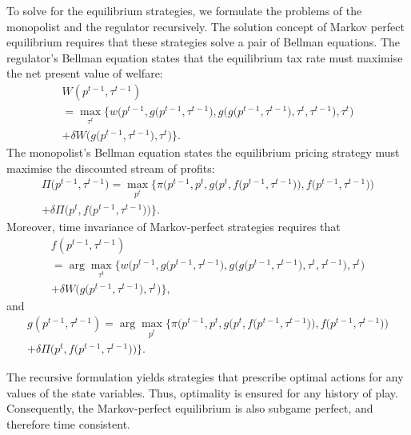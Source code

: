 To solve for the equilibrium strategies, we formulate the problems of the
monopolist and the regulator recursively. The solution concept of Markov
perfect equilibrium requires that these strategies solve a pair of Bellman
equations. The regulator's Bellman equation states that the equilibrium tax
rate must maximise the net present value of welfare: 
\begin{multline}
W(p^{t-1},\tau ^{t-1})  \label{tax:Bell_reg} \\
=\max_{\tau ^{t}}\Bigg\{w\bigg(p^{t-1},g\big(p^{t-1},\tau ^{t-1}\big),g\Big(g%
\big(p^{t-1},\tau ^{t-1}\big),\tau ^{t},\tau ^{t-1}\Big),\tau ^{t}\bigg) \\
+\delta W\Big(g\big(p^{t-1},\tau ^{t-1}\big),\tau ^{t}\Big)\Bigg\}.
\end{multline}%
The monopolist's Bellman equation states the equilibrium pricing strategy
must maximise the discounted stream of profits: 
\begin{multline}
\Pi \big(p^{t-1},\tau ^{t-1}\big)=\max_{p^{t}}\Bigg\{\pi \bigg(%
p^{t-1},p^{t},g\Big(p^{t},f\big(p^{t-1},\tau ^{t-1}\big)\Big),f\big(%
p^{t-1},\tau ^{t-1}\big)\bigg)  \label{tax:Bell_mon} \\
+\delta \Pi \bigg(p^{t},f\big(p^{t-1},\tau ^{t-1}\big)\bigg)\Bigg\}.
\end{multline}%
Moreover, time invariance of Markov-perfect strategies requires that 
\begin{multline}
f(p^{t-1},\tau ^{t-1})  \label{tax:strat_reg} \\
=\arg \max_{\tau ^{t}}\Bigg\{w\bigg(p^{t-1},g\big(p^{t-1},\tau ^{t-1}\big),g%
\Big(g\big(p^{t-1},\tau ^{t-1}\big),\tau ^{t},\tau ^{t-1}\Big),\tau ^{t}%
\bigg) \\
+\delta W\Big(g\big(p^{t-1},\tau ^{t-1}\big),\tau ^{t}\Big)\Bigg\},
\end{multline}%
and 
\begin{multline}
g(p^{t-1},\tau ^{t-1})=\arg \max_{p^{t}}\Bigg\{\pi \bigg(p^{t-1},p^{t},g\Big(%
p^{t},f\big(p^{t-1},\tau ^{t-1}\big)\Big),f\big(p^{t-1},\tau ^{t-1}\big)%
\bigg)  \label{tax:strat_mon} \\
+\delta \Pi \bigg(p^{t},f\big(p^{t-1},\tau ^{t-1}\big)\bigg)\Bigg\}.
\end{multline}

The recursive formulation yields strategies that prescribe optimal actions
for any values of the state variables. Thus, optimality is ensured for any
history of play. Consequently, the Markov-perfect equilibrium is also
subgame perfect, and therefore time consistent.

